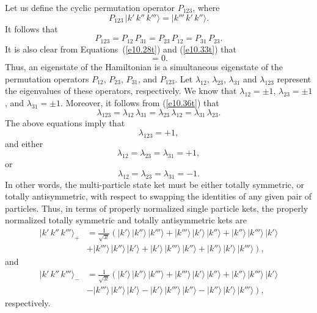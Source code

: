 Let us define the cyclic permutation operator $P_{123}$, where
\begin{equation}
P_{123} \,|k'\,k''\,k'''\rangle =|k'''\,k'\,k''\rangle.
\end{equation}
It follows that
\begin{equation}\label{e10.36t}
P_{123} = P_{12}\,P_{31}=P_{23}\,P_{12}=P_{31}\,P_{23}.
\end{equation}
It is also clear from Equations~(\ref{e10.28t}) and (\ref{e10.33t}) that
\begin{equation}
[H,P_{123}] = 0.
\end{equation}
Thus,  an eigenstate of the Hamiltonian is a simultaneous eigenstate of the permutation operators $P_{12}$, $P_{23}$, $P_{31}$,
and $P_{123}$. Let $\lambda_{12}$, $\lambda_{23}$, $\lambda_{31}$ and $\lambda_{123}$ represent  the eigenvalues of these operators,
respectively. We know that $\lambda_{12}=\pm 1$, $\lambda_{23}=\pm 1$, and $\lambda_{31}=\pm 1$.  Moreover, it follows from
(\ref{e10.36t}) that
\begin{equation}
\lambda_{123} = \lambda_{12}\,\lambda_{31} = \lambda_{23}\,\lambda_{12}=\lambda_{31}\,\lambda_{23}.
\end{equation}
The above equations imply that
\begin{equation}
\lambda_{123} = +1,
\end{equation}
and
either
\begin{equation}
\lambda_{12} = \lambda_{23} = \lambda_{31}= +1,
\end{equation}
or
\begin{equation}
\lambda_{12} = \lambda_{23} = \lambda_{31}= -1.
\end{equation}
In other words, the multi-particle state ket must be either totally symmetric, or totally antisymmetric, with respect to swapping the
identities of any given  pair
of particles. 
Thus, in terms of properly normalized single particle kets, the properly normalized totally symmetric and totally antisymmetric kets are 
\begin{align}
|k'\,k''\,k'''\rangle_+ &= \frac{1}{\sqrt{3!}}\left(|k'\rangle\,|k''\rangle\,|k'''\rangle + |k'''\rangle\,|k'\rangle\,|k''\rangle+|k''\rangle\,|k'''\rangle\,|k'\rangle \right.\nonumber\\[0.5ex]
&\left.+ |k'''\rangle\,|k''\rangle\,|k'\rangle + |k'\rangle\,|k'''\rangle\,|k''\rangle+ |k''\rangle\,|k'\rangle\,|k'''\rangle\right), 
\end{align}
and
\begin{align}\label{e10.43t}
|k'\,k''\,k'''\rangle_- &= \frac{1}{\sqrt{3!}}\left(|k'\rangle\,|k''\rangle\,|k'''\rangle + |k'''\rangle\,|k'\rangle\,|k''\rangle+|k''\rangle\,|k'''\rangle\,|k'\rangle \right.\nonumber\\[0.5ex]
&\left.-|k'''\rangle\,|k''\rangle\,|k'\rangle - |k'\rangle\,|k'''\rangle\,|k''\rangle- |k''\rangle\,|k'\rangle\,|k'''\rangle\right), 
\end{align}
respectively. 

